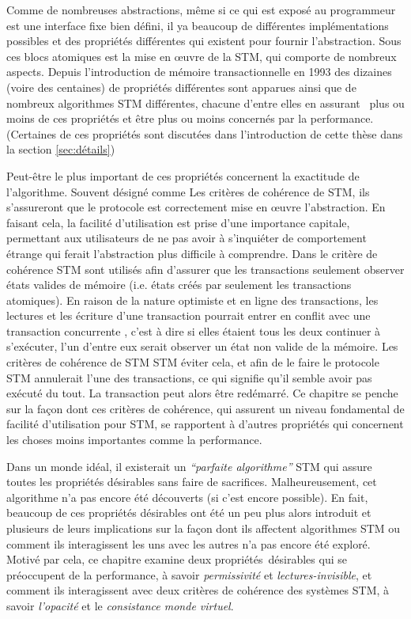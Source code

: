 Comme de nombreuses abstractions, même si ce qui est exposé au programmeur est une interface fixe bien défini,
il ya beaucoup de différentes implémentations possibles et des propriétés différentes qui existent pour fournir l'abstraction.
Sous ces blocs atomiques est la mise en œuvre de la STM, qui comporte de nombreux aspects.
Depuis l'introduction de mémoire transactionnelle en 1993 \cite{HM93} des dizaines (voire des centaines) de propriétés différentes
sont apparues ainsi que de nombreux algorithmes STM différentes, chacune d'entre elles en assurant  plus ou moins de ces propriétés et être plus ou moins concernés par la performance.
(Certaines de ces propriétés sont discutées dans l'introduction de cette thèse dans la section \ref{sec:détails})


Peut-être le plus important de ces propriétés concernent la exactitude de l'algorithme.
Souvent désigné comme Les critères de cohérence de STM, ils s'assureront que le protocole est correctement mise en œuvre l'abstraction.
En faisant cela, la facilité d'utilisation est prise d'une importance capitale,
permettant aux utilisateurs de ne pas avoir à s'inquiéter de comportement étrange qui ferait l'abstraction plus difficile à comprendre.
Dans le critère de cohérence STM sont utilisés afin d'assurer que les transactions seulement observer états
valides de mémoire (i.e. états créés par seulement les transactions atomiques).
En raison de la nature optimiste et en ligne des transactions, les lectures et les écriture d'une transaction pourrait entrer en conflit
avec une transaction concurrente , c'est à dire si elles étaient tous les deux continuer à s'exécuter, l'un d'entre eux serait observer un état non valide de la mémoire.
Les critères de cohérence de STM STM éviter cela, et afin de le faire le protocole STM annulerait l'une des transactions, ce qui signifie qu'il semble avoir pas exécuté du tout.
La transaction peut alors être redémarré.
Ce chapitre se penche sur la façon dont ces critères de cohérence, qui assurent un niveau fondamental de facilité d'utilisation pour STM,
se rapportent à d'autres propriétés qui concernent les choses moins importantes comme la performance.


Dans un monde idéal, il existerait un \emph{``parfaite algorithme''} STM qui assure toutes les propriétés désirables sans faire de sacrifices.
Malheureusement, cet algorithme n'a pas encore été découverts (si c'est encore possible).
En fait, beaucoup de ces propriétés désirables ont été un peu plus alors introduit et plusieurs de leurs implications sur la façon
dont ils affectent algorithmes STM ou comment ils interagissent les uns avec les autres n'a pas encore été exploré.
Motivé par cela, ce chapitre examine deux propriétés désirables qui se préoccupent de la performance,
à savoir \emph{permissivité} et \emph{lectures-invisible}, et comment ils interagissent avec deux critères de cohérence des systèmes STM,
à savoir \emph{l'opacité} et le \emph{consistance monde virtuel}.




